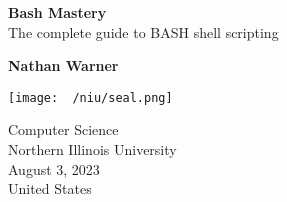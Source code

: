\documentclass{report}
\title{\Huge{}}
\author{\huge{Nathan Warner}}
\date{\huge{}}
\begin{document}
        \begin{titlepage}
       \begin{center}
           \vspace*{1cm}
    
           \textbf{Bash Mastery} \\
           The complete guide to BASH shell scripting
    
           \vspace{0.5cm}
            
                
           \vspace{1.5cm}
    
           \textbf{Nathan Warner}
    
           \vfill
                
                
           \vspace{0.8cm}
         
           \texttt{[image: ~/niu/seal.png]}
                
           Computer Science \\
           Northern Illinois University\\
           August 3, 2023 \\
           United States\\
           
                
       \end{center}
    \end{titlepage}
    \tableofcontents
    \pagebreak \bigbreak \noindent
\end{document}
